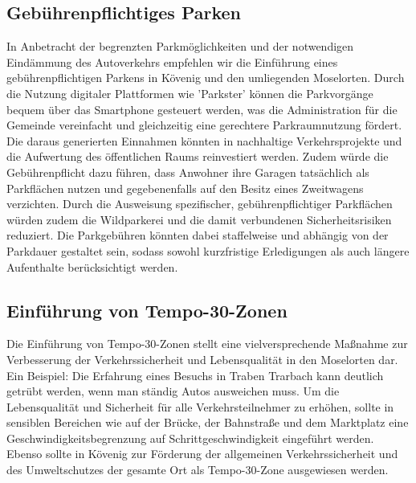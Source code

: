 \subsection{Gebührenpflichtiges Parken}
In Anbetracht der begrenzten Parkmöglichkeiten und der notwendigen Eindämmung des Autoverkehrs empfehlen wir die Einführung eines gebührenpflichtigen Parkens in Kövenig und den umliegenden Moselorten. Durch die Nutzung digitaler Plattformen wie 'Parkster' können die Parkvorgänge bequem über das Smartphone gesteuert werden, was die Administration für die Gemeinde vereinfacht und gleichzeitig eine gerechtere Parkraumnutzung fördert. Die daraus generierten Einnahmen könnten in nachhaltige Verkehrsprojekte und die Aufwertung des öffentlichen Raums reinvestiert werden. Zudem würde die Gebührenpflicht dazu führen, dass Anwohner ihre Garagen tatsächlich als Parkflächen nutzen und gegebenenfalls auf den Besitz eines Zweitwagens verzichten. Durch die Ausweisung spezifischer, gebührenpflichtiger Parkflächen würden zudem die Wildparkerei und die damit verbundenen Sicherheitsrisiken reduziert. Die Parkgebühren könnten dabei staffelweise und abhängig von der Parkdauer gestaltet sein, sodass sowohl kurzfristige Erledigungen als auch längere Aufenthalte berücksichtigt werden.

\subsection{Einführung von Tempo-30-Zonen}
Die Einführung von Tempo-30-Zonen stellt eine vielversprechende Maßnahme zur Verbesserung der Verkehrssicherheit und Lebensqualität in den Moselorten dar. Ein Beispiel: Die Erfahrung eines Besuchs in Traben Trarbach kann deutlich getrübt werden, wenn man ständig Autos ausweichen muss. Um die Lebensqualität und Sicherheit für alle Verkehrsteilnehmer zu erhöhen, sollte in sensiblen Bereichen wie auf der Brücke, der Bahnstraße und dem Marktplatz eine Geschwindigkeitsbegrenzung auf Schrittgeschwindigkeit eingeführt werden. Ebenso sollte in Kövenig zur Förderung der allgemeinen Verkehrssicherheit und des Umweltschutzes der gesamte Ort als Tempo-30-Zone ausgewiesen werden.



